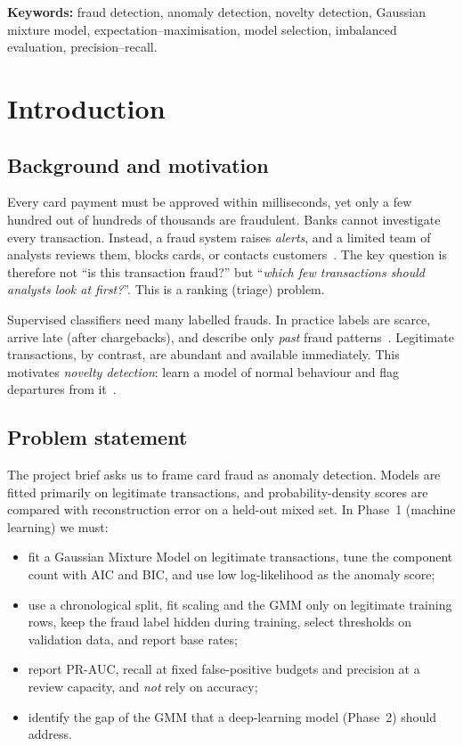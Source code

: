 \documentclass[12pt]{article}
\begin{document}
\medskip
\textbf{Keywords:} fraud detection, anomaly detection, novelty detection, Gaussian
mixture model, expectation--maximisation, model selection, imbalanced evaluation, precision--recall.

\newpage
\tableofcontents
\newpage

\section{Introduction}

\subsection{Background and motivation}
Every card payment must be approved within milliseconds, yet only a few hundred out of hundreds of thousands are
fraudulent. Banks cannot investigate every transaction. Instead, a fraud system raises \emph{alerts}, and a limited
team of analysts reviews them, blocks cards, or contacts customers~\cite{dalpozzolo2018}. The key question is
therefore not ``is this transaction fraud?'' but ``\emph{which few transactions should analysts look at first?}''.
This is a ranking (triage) problem.

Supervised classifiers need many labelled frauds. In practice labels are scarce, arrive late (after chargebacks),
and describe only \emph{past} fraud patterns~\cite{bolton2002}. Legitimate transactions, by contrast, are abundant and
available immediately. This motivates \emph{novelty detection}: learn a model of normal behaviour and flag departures
from it~\cite{chandola2009,pimentel2014}.

\subsection{Problem statement}
The project brief asks us to frame card fraud as anomaly detection. Models are fitted primarily on legitimate
transactions, and probability-density scores are compared with reconstruction error on a held-out mixed set. In
Phase~1 (machine learning) we must:
\begin{itemize}
\item fit a Gaussian Mixture Model on legitimate transactions, tune the component count with AIC and BIC, and use low
log-likelihood as the anomaly score;
\item use a chronological split, fit scaling and the GMM only on legitimate training rows, keep the fraud label hidden
during training, select thresholds on validation data, and report base rates;
\item report PR-AUC, recall at fixed false-positive budgets and precision at a review capacity, and \emph{not} rely on
accuracy;
\item identify the gap of the GMM that a deep-learning model (Phase~2) should address.
\end{itemize}
\end{document}
